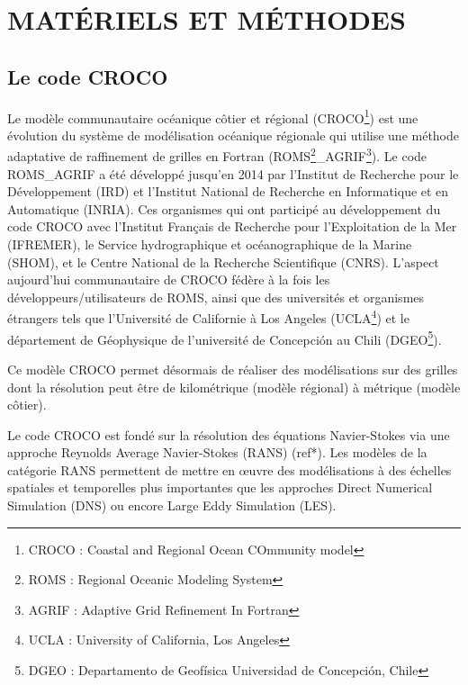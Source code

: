 \documentclass[10pt,a4paper,titlepage]{article}
\begin{document}
    \newpage

    \section{MATÉRIELS ET MÉTHODES}
    \label{sec:materiel_methodes}

    \subsection{Le code CROCO}
    \label{sub:croco}
    Le modèle communautaire océanique côtier et régional (CROCO\footnote{CROCO : Coastal and Regional Ocean COmmunity model}) est une évolution du système de modélisation océanique régionale qui utilise une méthode adaptative de raffinement de grilles en Fortran (ROMS\footnote{ROMS : Regional Oceanic Modeling System}\_AGRIF\footnote{AGRIF : Adaptive Grid Refinement In Fortran}).
    Le code ROMS\_AGRIF a été développé jusqu'en 2014 par l'Institut de Recherche pour le Développement (IRD) et l'Institut National de Recherche en Informatique et en Automatique (INRIA). Ces organismes qui ont participé au développement du code CROCO avec
    l'Institut Français de Recherche pour l'Exploitation de la Mer (IFREMER),
    le Service hydrographique et océanographique de la Marine (SHOM),
    et le Centre National de la Recherche Scientifique (CNRS).
    L'aspect aujourd'hui communautaire de CROCO fédère à la fois les développeurs/utilisateurs de ROMS, ainsi que des universités et organismes étrangers tels que l'Université de Californie à Los Angeles (UCLA\footnote{UCLA : University of California, Los Angeles})
    et le département de Géophysique de l'université de Concepción au Chili (DGEO\footnote{DGEO : Departamento de Geofísica Universidad de Concepción, Chile}).


    Ce modèle CROCO permet désormais de réaliser des modélisations sur des grilles dont la résolution peut être de kilométrique (modèle régional) à métrique (modèle côtier).

    Le code CROCO est fondé sur la résolution des équations Navier-Stokes via une approche Reynolds Average Navier-Stokes (RANS) \alert{(ref*)}.
Les modèles de la catégorie RANS permettent de mettre en \oe{}uvre des modélisations à des échelles spatiales et temporelles plus importantes que les approches Direct Numerical Simulation (DNS) ou encore Large Eddy Simulation (LES).
\end{document}
